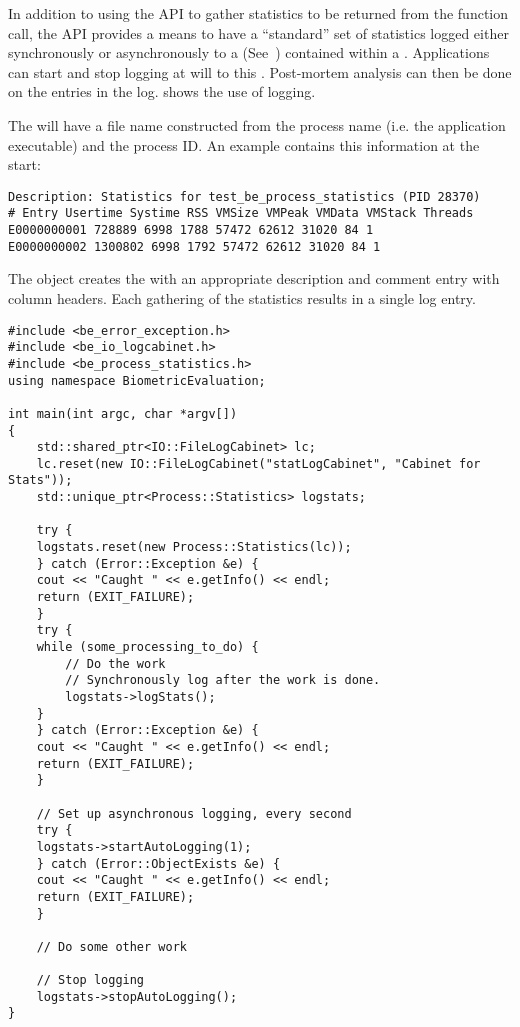 In addition to using the  API to gather statistics to be
returned from
the function call, the API provides a means to have a ``standard'' set of
statistics logged either synchronously or asynchronously to a 
 (See~) contained within a .
Applications can
start and stop logging at will to this . Post-mortem analysis can
then be done on the entries in the log.
 shows the use of logging.

The  will have a file name constructed from the process name (i.e.
the application executable) and the process ID. An example  contains
this information at the start:

\begin{verbatim}
Description: Statistics for test_be_process_statistics (PID 28370)
# Entry Usertime Systime RSS VMSize VMPeak VMData VMStack Threads
E0000000001 728889 6998 1788 57472 62612 31020 84 1
E0000000002 1300802 6998 1792 57472 62612 31020 84 1
\end{verbatim}

The  object creates the  with an appropriate description
and comment entry with column headers. Each gathering of the statistics results
in a single log entry.

\begin{lstlisting}[caption={Logging Process Statistics}, label=lst:processstatisticslogging]
#include <be_error_exception.h>
#include <be_io_logcabinet.h>
#include <be_process_statistics.h>
using namespace BiometricEvaluation;

int main(int argc, char *argv[])
{
    std::shared_ptr<IO::FileLogCabinet> lc;
    lc.reset(new IO::FileLogCabinet("statLogCabinet", "Cabinet for Stats"));
    std::unique_ptr<Process::Statistics> logstats;

    try {
	logstats.reset(new Process::Statistics(lc));
    } catch (Error::Exception &e) {
	cout << "Caught " << e.getInfo() << endl;
	return (EXIT_FAILURE);
    }
    try {
	while (some_processing_to_do) {
	    // Do the work
	    // Synchronously log after the work is done.
	    logstats->logStats();
	}
    } catch (Error::Exception &e) {
	cout << "Caught " << e.getInfo() << endl;
	return (EXIT_FAILURE);
    }

    // Set up asynchronous logging, every second
    try {
	logstats->startAutoLogging(1);
    } catch (Error::ObjectExists &e) {
	cout << "Caught " << e.getInfo() << endl;
	return (EXIT_FAILURE);
    }

    // Do some other work

    // Stop logging
    logstats->stopAutoLogging();
}
\end{lstlisting}

